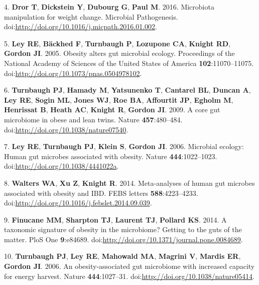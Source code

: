 \documentclass[12pt,]{article}
\begin{document}
4. \textbf{Dror T}, \textbf{Dickstein Y}, \textbf{Dubourg G},
\textbf{Paul M}. 2016. Microbiota manipulation for weight change.
Microbial Pathogenesis.
doi:\url{http://doi.org/10.1016/j.micpath.2016.01.002}.

5. \textbf{Ley RE}, \textbf{Bäckhed F}, \textbf{Turnbaugh P},
\textbf{Lozupone CA}, \textbf{Knight RD}, \textbf{Gordon JI}. 2005.
Obesity alters gut microbial ecology. Proceedings of the National
Academy of Sciences of the United States of America
\textbf{102}:11070--11075.
doi:\url{http://doi.org/10.1073/pnas.0504978102}.

6. \textbf{Turnbaugh PJ}, \textbf{Hamady M}, \textbf{Yatsunenko T},
\textbf{Cantarel BL}, \textbf{Duncan A}, \textbf{Ley RE}, \textbf{Sogin
ML}, \textbf{Jones WJ}, \textbf{Roe BA}, \textbf{Affourtit JP},
\textbf{Egholm M}, \textbf{Henrissat B}, \textbf{Heath AC},
\textbf{Knight R}, \textbf{Gordon JI}. 2009. A core gut microbiome in
obese and lean twins. Nature \textbf{457}:480--484.
doi:\url{http://doi.org/10.1038/nature07540}.

7. \textbf{Ley RE}, \textbf{Turnbaugh PJ}, \textbf{Klein S},
\textbf{Gordon JI}. 2006. Microbial ecology: Human gut microbes
associated with obesity. Nature \textbf{444}:1022--1023.
doi:\url{http://doi.org/10.1038/4441022a}.

8. \textbf{Walters WA}, \textbf{Xu Z}, \textbf{Knight R}. 2014.
Meta-analyses of human gut microbes associated with obesity and IBD.
FEBS letters \textbf{588}:4223--4233.
doi:\url{http://doi.org/10.1016/j.febslet.2014.09.039}.

9. \textbf{Finucane MM}, \textbf{Sharpton TJ}, \textbf{Laurent TJ},
\textbf{Pollard KS}. 2014. A taxonomic signature of obesity in the
microbiome? Getting to the guts of the matter. PloS One
\textbf{9}:e84689.
doi:\url{http://doi.org/10.1371/journal.pone.0084689}.

10. \textbf{Turnbaugh PJ}, \textbf{Ley RE}, \textbf{Mahowald MA},
\textbf{Magrini V}, \textbf{Mardis ER}, \textbf{Gordon JI}. 2006. An
obesity-associated gut microbiome with increased capacity for energy
harvest. Nature \textbf{444}:1027--31.
doi:\url{http://doi.org/10.1038/nature05414}.
\end{document}

